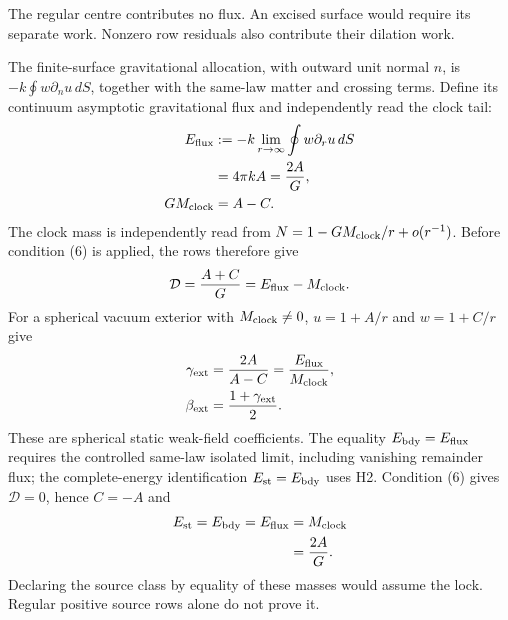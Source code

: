 The regular centre contributes no flux.  An excised surface would
require its separate work.  Nonzero row residuals also contribute
their dilation work.

The finite-surface gravitational allocation, with outward unit normal $n$, is
$-k\oint w\partial_n u\,dS$, together with the same-law matter and
crossing terms.  Define its continuum asymptotic gravitational flux
and independently read the clock tail:
\begin{equation}\label{eq:bridgeconditions-flux-energy}
 \begin{aligned}
 E_{\rm flux}
 &:=-k\lim_{r\to\infty}\oint w\partial_r u\,dS\\
 &=4\pi kA=\frac{2A}{G},\\
 GM_{\rm clock}&=A-C.
 \end{aligned}
\end{equation}
The clock mass is independently read from
$N=1-GM_{\rm clock}/r+o(r^{-1})$.
Before condition (6) is applied, the rows therefore give
\begin{equation}\label{eq:bridgeconditions-flux-clock}
 \mathcal D=\frac{A+C}{G}=E_{\rm flux}-M_{\rm clock}.
\end{equation}
For a spherical vacuum exterior with $M_{\rm clock}\ne0$,
$u=1+A/r$ and $w=1+C/r$ give
\begin{equation}\label{eq:bridgeconditions-exterior-ratio}
 \begin{aligned}
 \gamma_{\rm ext}&=\frac{2A}{A-C}
                 =\frac{E_{\rm flux}}{M_{\rm clock}},\\
 \beta_{\rm ext}&=\frac{1+\gamma_{\rm ext}}2 .
 \end{aligned}
\end{equation}
These are spherical static weak-field coefficients.
The equality $E_{\rm bdy}=E_{\rm flux}$ requires the controlled
same-law isolated limit, including vanishing remainder flux;
the complete-energy identification $E_{\rm st}=E_{\rm bdy}$ uses H2.
Condition (6) gives $\mathcal D=0$, hence $C=-A$ and
\begin{equation}\label{eq:one-h-mass-lock}
 \begin{aligned}
 E_{\rm st}=E_{\rm bdy}=E_{\rm flux}
   &=M_{\rm clock}\\
   &=\frac{2A}{G}.
 \end{aligned}
\end{equation}
Declaring the source class by equality of these masses would assume
the lock.  Regular positive source rows alone do not prove it.

